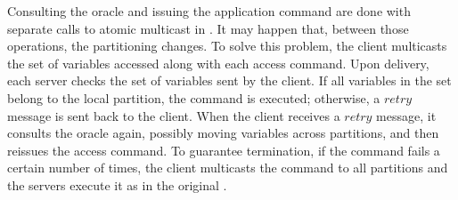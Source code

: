 Consulting the oracle and issuing the application command are done with separate calls to atomic multicast in \dssmr{}.
It may happen that, between those operations, the partitioning changes.
To solve this problem, the client multicasts the set of variables accessed along with each access command.
Upon delivery, each server checks the set of variables sent by the client.
If all variables in the set belong to the local partition, the command is executed; otherwise, a $retry$ message is sent back to the client.
When the client receives a $retry$ message, it consults the oracle again, possibly moving variables across partitions, and then reissues the access command.
To guarantee termination, if the command fails a certain number of times, the client multicasts the command to all partitions and the servers execute it as in the original \ssmr{}.



